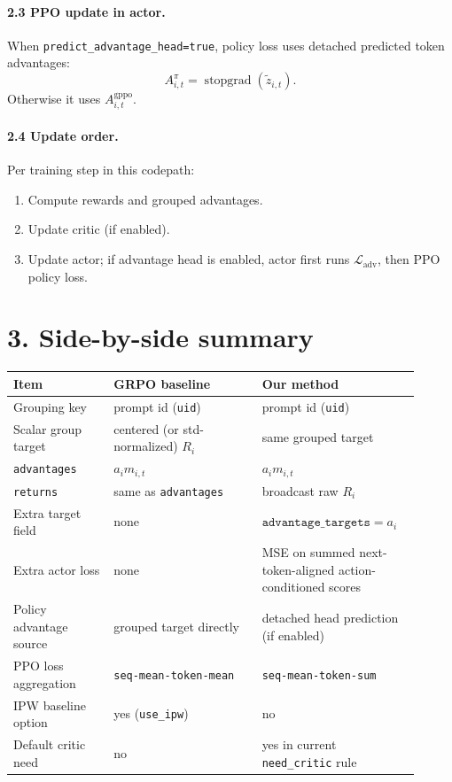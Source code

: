 \documentclass[11pt]{article}
\begin{document}
\paragraph{2.3 PPO update in actor.}
When \texttt{predict\_advantage\_head=true}, policy loss uses detached predicted token advantages:
\[
A_{i,t}^{\pi}=\operatorname{stopgrad}(\tilde z_{i,t}).
\]
Otherwise it uses \(A_{i,t}^{\text{gppo}}\).

\paragraph{2.4 Update order.}
Per training step in this codepath:
\begin{enumerate}
\item Compute rewards and grouped advantages.
\item Update critic (if enabled).
\item Update actor; if advantage head is enabled, actor first runs \(\mathcal{L}_{\text{adv}}\), then PPO policy loss.
\end{enumerate}

\section*{3. Side-by-side summary}
\begin{center}
\begin{tabular}{|p{0.23\linewidth}|p{0.34\linewidth}|p{0.34\linewidth}|}
\hline
\textbf{Item} & \textbf{GRPO baseline} & \textbf{Our method} \\
\hline
Grouping key & prompt id (\texttt{uid}) & prompt id (\texttt{uid}) \\
\hline
Scalar group target & centered (or std-normalized) \(R_i\) & same grouped target \\
\hline
\texttt{advantages} & \(a_i m_{i,t}\) & \(a_i m_{i,t}\) \\
\hline
\texttt{returns} & same as \texttt{advantages} & broadcast raw \(R_i\) \\
\hline
Extra target field & none & \(\texttt{advantage\_targets}=a_i\) \\
\hline
Extra actor loss & none & MSE on summed next-token-aligned action-conditioned scores \\
\hline
Policy advantage source & grouped target directly & detached head prediction (if enabled) \\
\hline
PPO loss aggregation & \texttt{seq-mean-token-mean} & \texttt{seq-mean-token-sum} \\
\hline
IPW baseline option & yes (\texttt{use\_ipw}) & no \\
\hline
Default critic need & no & yes in current \texttt{need\_critic} rule \\
\hline
\end{tabular}
\end{center}
\end{document}
